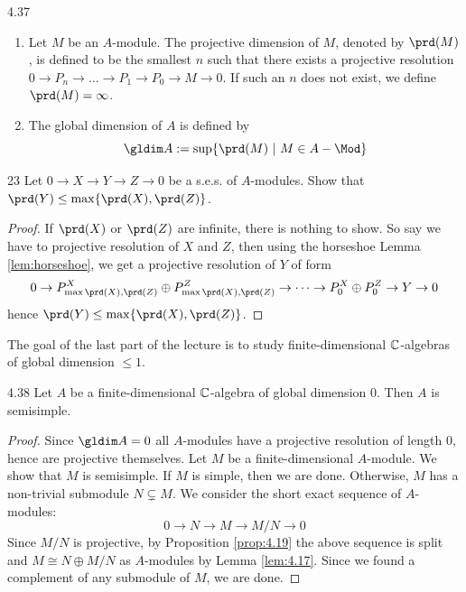 \documentclass[twoside = false,	%
		headsepline,		%
		parskip = true,
		]{scrbook}						%
\begin{document}
    \begin{definition}{}{4.37}
        \begin{enumerate}
            \item Let $M$ be an $A$-module. The projective dimension of $M$, denoted by $\prd(M)$, is defined to be the smallest $n$ such that there exists a projective resolution $0 \to P_n \to \dots \to P_1 \to P_0 \to M \to 0$. If such an $n$ does not exist, we define $\prd(M) = \infty$.
            \item The global dimension of $A$ is defined by
            \begin{equation*}
                \gldim A := \sup \{\prd (M) \ | \ M \in A-\Mod\}
            \end{equation*}
        \end{enumerate}
    \end{definition}

    \begin{exercise}{}{23}
        Let $0 \to X \to Y \to Z \to 0$ be a s.e.s. of $A$-modules. Show that $\prd(Y) \leq \max\{\prd(X),\prd(Z)\}$.
    \end{exercise}

    \begin{proof}
        If $\prd(X)$ or $\prd(Z)$ are infinite, there is nothing to show. So say we have to projective resolution of $X$ and $Z$, then using the horseshoe Lemma \ref{lem:horseshoe}, we get a projective resolution of $Y$ of form
        \begin{equation*}
            0 \to P^X_{\max{\prd(X),\prd(Z)}} \oplus P^Z_{\max{\prd(X),\prd(Z)}} \to \dots \to P^X_0 \oplus P^Z_0 \to Y \to 0
        \end{equation*}
        hence $\prd(Y) \leq \max\{\prd(X),\prd(Z)\}$.
    \end{proof}
    
    The goal of the last part of the lecture is to study finite-dimensional $\mathbb C$-algebras of global dimension $\leq 1$.

    \begin{proposition}{}{4.38}
        Let $A$ be a finite-dimensional $\mathbb C$-algebra of global dimension $0$. Then $A$ is semisimple.
    \end{proposition}

    \begin{proof}
        Since $\gldim A = 0$ all $A$-modules have a projective resolution of length $0$, hence are projective themselves. Let $M$ be a finite-dimensional $A$-module. We show that $M$ is semisimple. If $M$ is simple, then we are done. Otherwise, $M$ has a non-trivial submodule $N \subsetneq M$. We consider the short exact sequence of $A$-modules:
        \begin{equation*}
            0 \to N \to M \to M/N \to 0
        \end{equation*}
        Since $M/N$ is projective, by Proposition \ref{prop:4.19} the above sequence is split and $M \cong N \oplus M/N$ as $A$-modules by Lemma \ref{lem:4.17}. Since we found a complement of any submodule of $M$, we are done.
    \end{proof}
    
\end{document}
